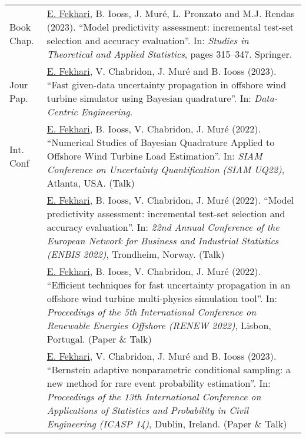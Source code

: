 \begin{table*}[h]
    \small
    \renewcommand*{\arraystretch}{1.4}
    \begin{tabularx}{\textwidth}{l X}
        Book Chap. & \underline{E. Fekhari}, B. Iooss, J. Muré, L. Pronzato and M.J. Rendas (2023). 
                    ``Model predictivity assessment: incremental test-set selection and accuracy evaluation''. 
                    In: \textit{Studies in Theoretical and Applied Statistics}, pages 315--347. Springer.\\

        Jour Pap.   & \underline{E. Fekhari}, V. Chabridon, J. Muré and B. Iooss (2023).
                    ``Fast given-data uncertainty propagation in offshore wind turbine simulator using Bayesian quadrature''. 
                    In: \textit{Data-Centric Engineering}.\\
        
        Int. Conf   & \underline{E. Fekhari}, B. Iooss, V. Chabridon, J. Muré (2022).
                    ``Numerical Studies of Bayesian Quadrature Applied to Offshore Wind Turbine Load Estimation''.
                    In: \textit{SIAM Conference on Uncertainty Quantification (SIAM UQ22)}, Atlanta, USA. (Talk)\\
        
                    & \underline{E. Fekhari}, B. Iooss, V. Chabridon, J. Muré (2022). 
                    ``Model predictivity assessment: incremental test-set selection and accuracy evaluation''.
                    In: \textit{22nd Annual Conference of the European Network for Business and Industrial Statistics (ENBIS 2022)}, Trondheim, Norway. (Talk)\\
        
                    & \underline{E. Fekhari}, B. Iooss, V. Chabridon, J. Muré (2022). 
                    ``Efficient techniques for fast uncertainty propagation in an offshore wind turbine multi-physics simulation tool''.
                    In: \textit{Proceedings of the 5th International Conference on Renewable Energies Offshore (RENEW 2022)}, Lisbon, Portugal. (Paper \& Talk)\\
        
                    & \underline{E. Fekhari}, V. Chabridon, J. Muré and B. Iooss (2023). 
                    ``Bernstein adaptive nonparametric conditional sampling: a new method for rare event probability estimation''.
                    In: \textit{Proceedings of the 13th International Conference on Applications of Statistics and Probability in Civil Engineering (ICASP 14)}, Dublin, Ireland. (Paper \& Talk)\\
        

\end{tabularx}
\end{table*}
